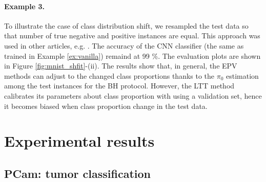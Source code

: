 \documentclass{article}
\begin{document}
\paragraph{Example 3.} To illustrate the case of class distribution shift, we resampled the test data so that number of true negative and positive instances are equal. This approach was used in other articles, e.g.  \cite{joseph_d__viviano__2019}. The accuracy of the CNN classifier (the same as trained in Example \ref{ex:vanilla}) remaind at 99 \%. The evaluation plots are shown in Figure \ref{fig:mnist_shfit}-(ii). The results show that, in general, the EPV methods can adjust to the changed class proportions thanks to the $\pi_0$ estimation among the test instances for the BH protocol. However, the LTT method calibrates its parameters about class proportion with using a validation set, hence it becomes biased when class proportion change in the test data. 
%

\section{Experimental results}

\subsection{PCam: tumor classification}
\end{document}
